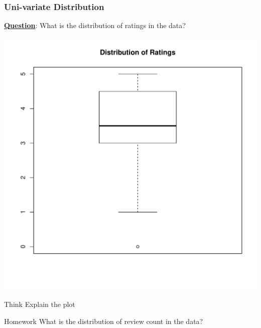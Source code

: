 \documentclass[12pt]{book}\usepackage{knitr}
\begin{document}
\subsubsection{Uni-variate Distribution}
\noindent \textbf{\underline{Question}}: What is the distribution of ratings in the data?
\begin{knitrout}
\color{fgcolor}\begin{kframe}
\begin{alltt}
\hlopt{$} \hlstd{=} \hlstd{)}
\end{alltt}
\end{kframe}
\includegraphics[width=\maxwidth]{figure/boxplotStars-1} 

\end{knitrout}

\begin{DIY}{Think}
\noindent Explain the plot
\end{DIY}

\begin{DIY}{Homework}
\noindent What is the distribution of review count in the data?
\end{DIY}

\newpage
\end{document}
